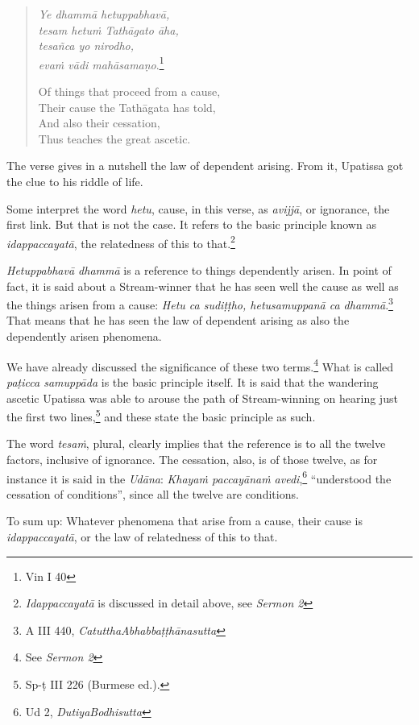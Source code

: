 \clearpage

\begin{quote}
\emph{Ye dhammā hetuppabhavā,}\\
\emph{tesam hetuṁ Tathāgato āha,}\\
\emph{tesañca yo nirodho,}\\
\emph{evaṁ vādi mahāsamaṇo}.\footnote{Vin I 40}

Of things that proceed from a cause,\\
Their cause the Tathāgata has told,\\
And also their cessation,\\
Thus teaches the great ascetic.
\end{quote}

The verse gives in a nutshell the law of dependent arising. From it, Upatissa got the clue to his riddle of life.

Some interpret the word \emph{hetu}, cause, in this verse, as \emph{avijjā}, or ignorance, the first link. But that is not the case. It refers to the basic principle known as \emph{idappaccayatā}, the relatedness of this to that.\footnote{\emph{Idappaccayatā} is discussed in detail above, see \emph{Sermon 2}}

\emph{Hetuppabhavā dhammā} is a reference to things dependently arisen. In point of fact, it is said about a Stream-winner that he has seen well the cause as well as the things arisen from a cause: \emph{Hetu ca sudiṭṭho, hetusamuppanā ca dhammā}.\footnote{A III 440, \emph{CatutthaAbhabbaṭṭhānasutta}} That means that he has seen the law of dependent arising as also the dependently arisen phenomena.

We have already discussed the significance of these two terms.\footnote{See \emph{Sermon 2}} What is called \emph{paṭicca samuppāda} is the basic principle itself. It is said that the wandering ascetic Upatissa was able to arouse the path of Stream-winning on hearing just the first two lines,\footnote{Sp-ṭ III 226 (Burmese ed.).} and these state the basic principle as such.

The word \emph{tesaṁ}, plural, clearly implies that the reference is to all the twelve factors, inclusive of ignorance. The cessation, also, is of those twelve, as for instance it is said in the \emph{Udāna}: \emph{Khayaṁ paccayānaṁ avedi},\footnote{Ud 2, \emph{DutiyaBodhisutta}} ``understood the cessation of conditions'', since all the twelve are conditions.

To sum up: Whatever phenomena that arise from a cause, their cause is \emph{idappaccayatā}, or the law of relatedness of this to that.

